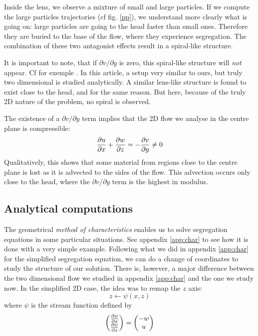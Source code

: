 Inside the lens, we observe a mixture of small and large particles. 
If we compute the large particles trajectories (cf fig. \ref{pp}), we understand more clearly what is going on: large particles are going to the head faster than small ones. Therefore they are buried to the base of the flow, where they experience segregation. The combination of these two antagonist effects result in a spiral-like structure.

It is important to note, that if $\partial v / \partial y$ is zero, this spiral-like structure will \textit{not} appear. Cf for exemple \cite{2D}. In this article, a setup very similar to ours, but truly two dimensional is studied analytically. A similar lens-like structure is found to exist close to the head, and for the same reason. But here, because of the truly 2D nature of the problem, no spiral is observed.

The existence of a $\partial v / \partial y$ term implies that the 2D flow we analyse in the centre plane is compressible:
\begin{equation}
	\frac{\partial {u}}{\partial {x}} + \frac{\partial {w}}{\partial {z}} = - \frac{\partial {v}}{\partial {y}} \neq 0
\end{equation} 
Qualitatively, this shows that some material from regions close to the centre plane is lost as it is advected to the sides of the flow. This advection occurs only close to the head, where the $\partial v / \partial y$ term is the highest in modulus.

\subsection{Analytical computations}

The geometrical \textit{method of characteristics} enables us to solve segregation equations in some particular situations. See appendix \ref{app:char} to see how it is done with a very simple example.
Following what we did in appendix \ref{app:char}  for the simplified segregation equation, we can do a change of coordinates to study the structure of our solution.
There is, however, a major difference between the two dimensional flow we studied in appendix \ref{app:char} and the one we study now.
In the simplified 2D case, the idea was to remap the $z$ axis: 
\begin{equation}
	z \leftarrow \psi(x,z)
\end{equation}
where $\psi$ is the stream function defined by 
\begin{equation}
	\begin{pmatrix}
	\frac{\partial {\psi}}{\partial {x}}\\
	\frac{\partial {\psi}}{\partial {z}} 
\end{pmatrix}
=
	\begin{pmatrix}
	-w\\
	u 
\end{pmatrix}
\end{equation}

